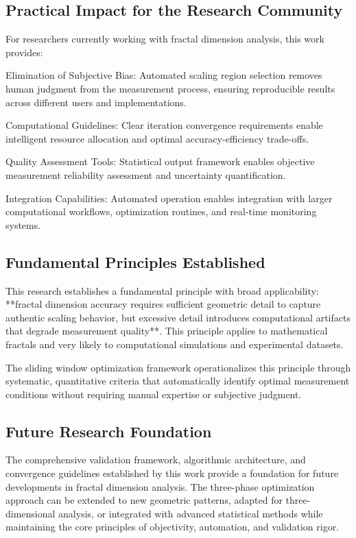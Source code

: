 \documentclass[preprint,12pt]{elsarticle}
\def\textbf#1{#1}%
\begin{document}
\subsection{Practical Impact for the Research Community}

For researchers currently working with fractal dimension analysis, this work provides:

\textbf{Elimination of Subjective Bias}: Automated scaling region selection removes human judgment from the measurement process, ensuring reproducible results across different users and implementations.

\textbf{Computational Guidelines}: Clear iteration convergence requirements enable intelligent resource allocation and optimal accuracy-efficiency trade-offs.

\textbf{Quality Assessment Tools}: Statistical output framework enables objective measurement reliability assessment and uncertainty quantification.

\textbf{Integration Capabilities}: Automated operation enables integration with larger computational workflows, optimization routines, and real-time monitoring systems.

\subsection{Fundamental Principles Established}

This research establishes a fundamental principle with broad applicability: **fractal dimension accuracy requires sufficient geometric detail to capture authentic scaling behavior, but excessive detail introduces computational artifacts that degrade measurement quality**. This principle applies to mathematical fractals and very likely to  computational simulations and experimental datasets.

The sliding window optimization framework operationalizes this principle through systematic, quantitative criteria that automatically identify optimal measurement conditions without requiring manual expertise or subjective judgment.

\subsection{Future Research Foundation}

The comprehensive validation framework, algorithmic architecture, and convergence guidelines established by this work provide a foundation for future developments in fractal dimension analysis. The three-phase optimization approach can be extended to new geometric patterns, adapted for three-dimensional analysis, or integrated with advanced statistical methods while maintaining the core principles of objectivity, automation, and validation rigor.
\end{document}
